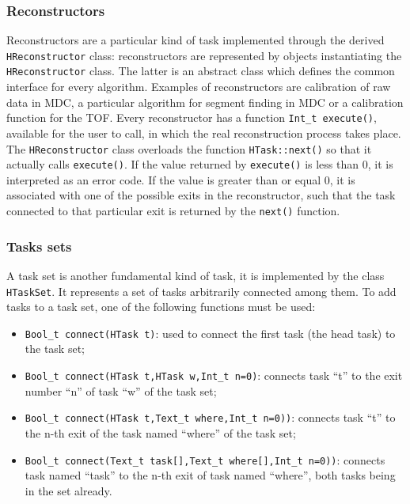 


\subsubsection{Reconstructors}

Reconstructors are a particular kind of task implemented through the derived \verb+HReconstructor+ 
class: reconstructors are represented by objects instantiating the \verb+HReconstructor+ class. 
The latter is an abstract class which defines the common interface for every algorithm. Examples 
of reconstructors are calibration of raw data in MDC, a particular algorithm for segment finding 
in MDC or a calibration function for the TOF. Every reconstructor has a function \verb+Int_t execute()+, 
available for the user to call, in which the real reconstruction process takes place. The 
\verb+HReconstructor+ class overloads the function \verb+HTask::next()+ so that it actually 
calls \verb+execute()+. If the value returned by \verb+execute()+ is less than 0, it is 
interpreted as an error code. If the value is greater than or equal 0, it is associated 
with one of the possible exits in the reconstructor, such that the task connected to that 
particular exit is returned by the \verb+next()+ function.

\subsubsection{Tasks sets} \label{Chapter_tasks}

A task set is another fundamental kind of task, it is implemented by the class \verb+HTaskSet+. It 
represents a set of tasks arbitrarily connected among them. To add tasks to a task set, one of 
the following functions must be used:
\begin{itemize}
    \item \verb+Bool_t connect(HTask t)+: used to connect the first task (the head task) to the task set;
    \item \verb+Bool_t connect(HTask t,HTask w,Int_t n=0)+: connects task ``t'' to the exit number 
    ``n'' of task ``w'' of the task set;
    \item \verb+Bool_t connect(HTask t,Text_t where,Int_t n=0))+: connects task ``t'' to the 
    n-th exit of the task named ``where'' of the task set;
    \item \verb+Bool_t connect(Text_t task[],Text_t where[],Int_t n=0))+: connects task named 
    ``task'' to the n-th exit of task named ``where'', both tasks being in the set already. 
\end{itemize}

